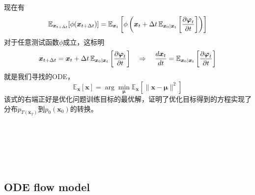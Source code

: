 \documentclass{article}
\newcommand{\tmmathbf}[1]{\ensuremath{\boldsymbol{#1}}}
\begin{document}
\begin{CJK*}{UTF8}{gbsn}
现在有
\[ \mathbb{E}_{\tmmathbf{x}_{t + \Delta t}} [\phi (\tmmathbf{x}_{t + \Delta
   t})] =\mathbb{E}_{\tmmathbf{x}_t}  \left[ \phi \left( \tmmathbf{x}_t +
   \Delta t \hspace{0.17em} \mathbb{E}_{\tmmathbf{x}_0 |\tmmathbf{x}_t} \left[
   \frac{\partial \tmmathbf{\varphi}_t}{\partial t} \right] \right) \right] \]
对于任意测试函数$\phi$成立，这标明
\[ \tmmathbf{x}_{t + \Delta t} =\tmmathbf{x}_t + \Delta t \hspace{0.17em}
   \mathbb{E}_{\tmmathbf{x}_0 |\tmmathbf{x}_t} \left[ \frac{\partial
   \tmmathbf{\varphi}_t}{\partial t} \right] \quad \Rightarrow \quad
   \frac{d\tmmathbf{x}_t}{dt} =\mathbb{E}_{\tmmathbf{x}_0 |\tmmathbf{x}_t}
   \left[ \frac{\partial \tmmathbf{\varphi}_t}{\partial t} \right]
   \label{eq:real-ode} \]
就是我们寻找的ODE，
\[ \mathbb{E}_{\tmmathbf{x}} [\tmmathbf{x}] = \arg \min_{\tmmathbf{\mu}}
   \mathbb{E}_{\tmmathbf{x}} [\|\tmmathbf{x}-\tmmathbf{\mu}\|^2]
   \label{eq:mean-opt} \]
该式的右端正好是优化问题训练目标的最优解，证明了优化目标得到的方程实现了分布$p_{T
(\tmmathbf{x}_T)}$到$p_0 (\tmmathbf{x}_0)$的转换。

\

\

\

\subsection{ODE flow model}


\end{CJK*}
\end{document}
